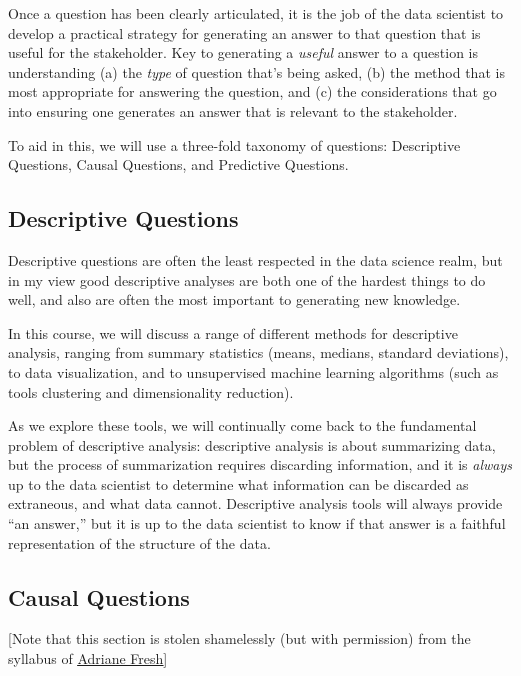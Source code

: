 \documentclass[12pt]{article}
\begin{document}
Once a question has been clearly articulated, it is the job of the data scientist to develop a practical strategy for generating an answer to that question that is useful for the stakeholder. Key to generating a \emph{useful} answer to a question is understanding (a) the \emph{type} of question that's being asked, (b) the method that is most appropriate for answering the question, and (c) the considerations that go into ensuring one generates an answer that is relevant to the stakeholder.

To aid in this, we will use a three-fold taxonomy of questions: Descriptive Questions, Causal Questions, and Predictive Questions.

\subsection{Descriptive Questions}

Descriptive questions are often the least respected in the data science realm, but in my view good descriptive analyses are both one of the hardest things to do well, and also are often the most important to generating new knowledge.

In this course, we will discuss a range of different methods for descriptive analysis, ranging from summary statistics (means, medians, standard deviations), to data visualization, and to unsupervised machine learning algorithms (such as tools clustering and dimensionality reduction).

As we explore these tools, we will continually come back to the fundamental problem of descriptive analysis: descriptive analysis is about summarizing data, but the process of summarization requires discarding information, and it is \emph{always} up to the data scientist to determine what information can be discarded as extraneous, and what data cannot. Descriptive analysis tools will always provide ``an answer,'' but it is up to the data scientist to know if that answer is a faithful representation of the structure of the data.

\subsection{Causal Questions}

[Note that this section is stolen shamelessly (but with permission) from the syllabus of \href{http://www.adrianefresh.com}{\underline{Adriane Fresh}}]
\end{document}
